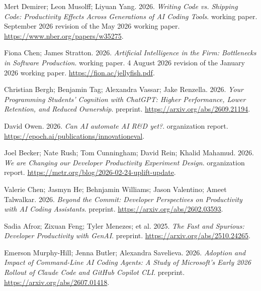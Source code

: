 {\begin{description}[leftmargin=2em,labelwidth=1.5em,itemsep=1pt,parsep=0pt]
\item[23.] \hypertarget{ref-demirer2026}{} Mert Demirer; Leon Musolff; Liyuan Yang. 2026. \textit{Writing Code vs. Shipping Code: Productivity Effects Across Generations of AI Coding Tools}. working paper. September 2026 revision of the May 2026 working paper. \url{https://www.nber.org/papers/w35275}.

\item[24.] \hypertarget{ref-chenstratton2026}{} Fiona Chen; James Stratton. 2026. \textit{Artificial Intelligence in the Firm: Bottlenecks in Software Production}. working paper. 4 August 2026 revision of the January 2026 working paper. \url{https://fion.ac/jellyfish.pdf}.

\item[25.] \hypertarget{ref-bergh2026}{} Christian Bergh; Benjamin Tag; Alexandra Vassar; Jake Renzella. 2026. \textit{Your Programming Students' Cognition with ChatGPT: Higher Performance, Lower Retention, and Reduced Ownership}. preprint. \url{https://arxiv.org/abs/2609.21194}.

\item[26.] \hypertarget{ref-innovationeval2026}{} David Owen. 2026. \textit{Can AI automate AI R\&D yet?}. organization report. \url{https://epoch.ai/publications/innovationeval}.

\item[27.] \hypertarget{ref-metr2026update}{} Joel Becker; Nate Rush; Tom Cunningham; David Rein; Khalid Mahamud. 2026. \textit{We are Changing our Developer Productivity Experiment Design}. organization report. \url{https://metr.org/blog/2026-02-24-uplift-update}.

\item[28.] \hypertarget{ref-chen2026}{} Valerie Chen; Jasmyn He; Behnjamin Williams; Jason Valentino; Ameet Talwalkar. 2026. \textit{Beyond the Commit: Developer Perspectives on Productivity with AI Coding Assistants}. preprint. \url{https://arxiv.org/abs/2602.03593}.

\item[29.] \hypertarget{ref-afroz2025}{} Sadia Afroz; Zixuan Feng; Tyler Menezes; et al. 2025. \textit{The Fast and Spurious: Developer Productivity with GenAI}. preprint. \url{https://arxiv.org/abs/2510.24265}.

\item[30.] \hypertarget{ref-murphyhill2026}{} Emerson Murphy-Hill; Jenna Butler; Alexandra Savelieva. 2026. \textit{Adoption and Impact of Command-Line AI Coding Agents: A Study of Microsoft's Early 2026 Rollout of Claude Code and GitHub Copilot CLI}. preprint. \url{https://arxiv.org/abs/2607.01418}.


\end{description}}
